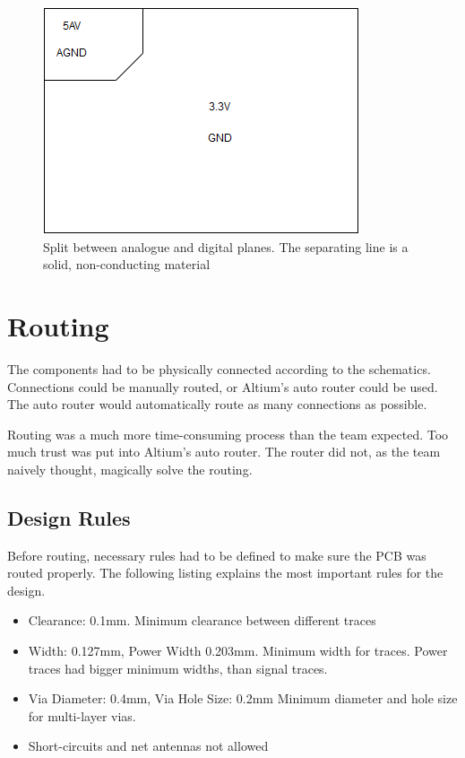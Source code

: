 \begin{figure}[h!]
\centering
\includegraphics[scale = 0.6]{images/Split_planes.png}
\caption{Split between analogue and digital planes. The separating line is a solid, non-conducting material}
\label{fig:Split planes}
\end{figure}

\section{Routing}
The components had to be physically connected according to the schematics.
Connections could be manually routed, or Altium's auto router could be used. 
The auto router would automatically route as many connections as possible.  

Routing was a much more time-consuming process than the team expected. 
Too much trust was put into Altium's auto router. 
The router did not, as the team naively thought, magically solve the routing. 

\subsection{Design Rules}
Before routing, necessary rules had to be defined to make sure the PCB was routed properly. 
The following listing explains the most important rules for the design.
\begin{itemize}
\item Clearance: 0.1mm. 
\newline
Minimum clearance between different traces
\item Width: 0.127mm, Power Width 0.203mm.
\newline
Minimum width for traces. 
Power traces had bigger minimum widths, than signal traces.
\item Via Diameter: 0.4mm, Via Hole Size: 0.2mm
\newline
Minimum diameter and hole size for multi-layer vias.
\item Short-circuits and net antennas not allowed
\end{itemize}

